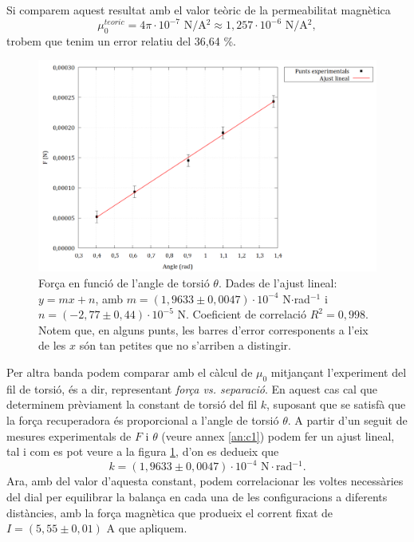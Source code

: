 \documentclass[a4paper,10.5pt]{report}
\begin{document}
Si comparem aquest resultat amb el valor teòric de la permeabilitat magnètica
\begin{equation*}
	\mu_0^{teoric} = 4\pi\cdot 10^{-7} \text{ N/A$^2$} \approx 1,257\cdot10^{-6} \text{ N/A$^2$},
\end{equation*}
trobem que tenim un error relatiu del 36,64 \%.

\begin{figure}[H]
	\centering
	\includegraphics[width=0.8\linewidth]{screenshot017}
	\caption{Força en funció de l'angle de torsió $\theta$. Dades de l'ajust lineal: $y=mx+n$, amb $m=(1,9633\pm0,0047)\cdot10^{-4}$ N$\cdot$rad$^{-1}$ i $n=(-2,77\pm0,44)\cdot10^{-5}$ N. Coeficient de correlació $R^2=0,998$. Notem que, en alguns punts, les barres d'error corresponents a l'eix de les $x$ són tan petites que no s'arriben a distingir.}
	\label{fig:2.4}
\end{figure}

Per altra banda podem comparar amb el càlcul de $\mu_0$ mitjançant l'experiment del fil de torsió, és a dir, representant \textit{força vs. separació}. En aquest cas cal que determinem prèviament la constant de torsió del fil $k$, suposant que se satisfà que la força recuperadora és proporcional a l'angle de torsió $\theta$. A partir d'un seguit de mesures experimentals de $F$ i $\theta$ (veure annex \ref{an:c1}) podem fer un ajust lineal, tal i com es pot veure a la figura \ref{fig:2.4}, d'on es dedueix que
\begin{equation*}
	k = (1,9633\pm 0,0047)\cdot 10^{-4} \text{ N$\cdot$rad$^{-1}$}.
\end{equation*}
Ara, amb del valor d'aquesta constant, podem correlacionar les voltes necessàries del dial per equilibrar la balança en cada una de les configuracions a diferents distàncies, amb la força magnètica que produeix el corrent fixat de $I = (5,55 \pm 0,01)$ A que apliquem. 
\end{document}
